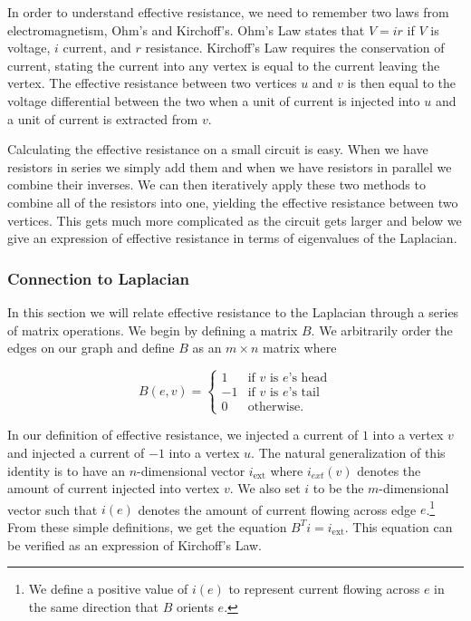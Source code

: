 \documentclass[12pt,twoside]{article}
\begin{document}

In order to understand effective resistance, we need to remember two laws from electromagnetism, Ohm's and Kirchoff's. Ohm's Law states that $V=ir$ if $V$ is voltage, $i$ current, and $r$ resistance. Kirchoff's Law requires the conservation of current, stating the current into any vertex is equal to the current leaving the vertex. The effective resistance between two vertices $u$ and $v$ is then equal to the voltage differential between the two when a unit of current is injected into $u$ and a unit of current is extracted from $v$.


Calculating the effective resistance on a small circuit is easy. When we have resistors in series we simply add them and when we have resistors in parallel we combine their inverses. We can then iteratively apply these two methods to combine all of the resistors into one, yielding the effective resistance between two vertices. This gets much more complicated as the circuit gets larger and below we give an expression of effective resistance in terms of eigenvalues of the Laplacian. 


\subsubsection{Connection to Laplacian}

In this section we will relate effective resistance to the Laplacian through a series of matrix operations. We begin by defining a matrix $B$. We arbitrarily order the edges on our graph and define $B$ as an $m \times n$ matrix where

\begin{equation}
\label{def:resistance-b}
B(e,v)  = 
            \begin{cases}
                1     &\mbox{if $v$ is $e$'s head} \\
                -1    &\mbox{if $v$ is $e$'s tail} \\
                0     &\mbox{otherwise.} 
            \end{cases}
\end{equation}

In our definition of effective resistance, we injected a current of $1$ into a vertex $v$ and injected a current of $-1$ into a vertex $u$. The natural generalization of this identity is to have an $n$-dimensional vector $i_{\text{ext}}$ where $i_{ext}(v)$ denotes the amount of current injected into vertex $v$. We also set $i$ to be the $m$-dimensional vector such that $i(e)$ denotes the amount of current flowing across edge $e$.\footnote{We define a positive value of $i(e)$ to represent current flowing across $e$ in the same direction that $B$ orients $e$.} From these simple definitions, we get the equation $B^Ti = i_{\text{ext}}$. This equation can be verified as an expression of Kirchoff's Law.
\end{document}
